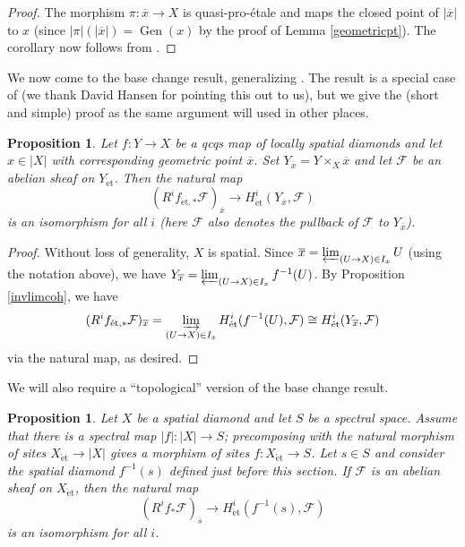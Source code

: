\documentclass{amsart}
\newtheorem{prop}[subsubsection]{Proposition}
\theoremstyle{remark}
\numberwithin{equation}{subsection}
\newcommand{\cF}{{\mathcal F}}
\DeclareMathOperator{\Gen}{Gen}
\newcommand{\et}{\mathrm{\acute{e}t}}
\newcommand{\ol}{\overline}
\renewcommand{\(}{\left(}
\renewcommand{\)}{\right)}
\begin{document}
\begin{proof}
The morphism $\pi \colon \ol{x} \to X$ is quasi-pro-\'etale and maps the closed point of $|\ol{x}|$ to $x$ (since $|\pi|(|\ol{x}|)=\Gen(x)$ by the proof of Lemma \ref{geometricpt}). The corollary now follows from \cite[Proposition 14.3]{diamonds}.
\end{proof}

We now come to the base change result, generalizing \cite[Lemma 4.4.1]{caraiani-scholze}. The result is a special case of \cite[Corollary 16.10(ii)]{diamonds} (we thank David Hansen for pointing this out to us), but we give the (short and simple) proof as the same argument will used in other places.

\begin{prop}\label{basechange}
Let $f \colon Y \to X$ be a qcqs map of locally spatial diamonds and let $x\in |X|$ with corresponding geometric point $\ol{x}$. Set $Y_{\ol{x}}=Y\times_{X}\ol{x}$ and let $\cF$ be an abelian sheaf on $Y_{\et}$. Then the natural map
$$ (R^{i}f_{\et,\ast}\cF)_{\ol{x}} \to H^{i}_{\et}(Y_{\ol{x}},\cF) $$
is an isomorphism for all $i$ (here $\cF$ also denotes the pullback of $\cF$ to $Y_{\ol{x}}$).
\end{prop}

\begin{proof}
Without loss of generality, $X$ is spatial. Since $\ol{x}=\varprojlim_{(U \to X) \in I_{x}}U$ (using the notation above), we have $Y_{\ol{x}} = \varprojlim_{(U \to X) \in I_{x}}f^{-1}(U)$. By Proposition \ref{invlimcoh}, we have
$$ (R^{i}f_{\et,\ast}\cF)_{\ol{x}} = \varinjlim_{(U\to X)\in I_{x}} H^{i}_{\et}(f^{-1}(U),\cF) \cong H^{i}_{\et}(Y_{\ol{x}},\cF) $$
via the natural map, as desired.
\end{proof}

We will also require a ``topological'' version of the base change result.

\begin{prop}\label{topbasechange}
Let $X$ be a spatial diamond and let $S$ be a spectral space. Assume that there is a spectral map $|f| \colon |X| \to S$; precomposing with the natural morphism of sites $X_{\et} \to |X|$ gives a morphism of sites $f \colon X_{\et} \to S$. Let $s\in S$ and consider the spatial diamond $f^{-1}(s)$ defined just before this section. If $\cF$ is an abelian sheaf on $X_{\et}$, then the natural map
$$ (R^{i}f_{\ast}\cF)_{s} \to H^{i}_{\et}(f^{-1}(s),\cF) $$
is an isomorphism for all $i$.
\end{prop}
\end{document}
